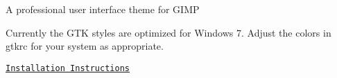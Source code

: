A professional user interface theme for G\+I\+MP



Currently the G\+TK styles are optimized for Windows 7. Adjust the colors in gtkrc for your system as appropriate.

\href{http://thegimp.ca/how-to-install-a-new-theme-in-the-gimp-in-windows/}{\tt Installation Instructions} 